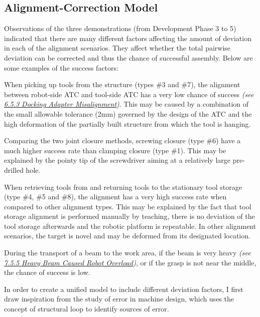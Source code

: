 \subsection{Alignment-Correction Model}

Observations of the three demonstrations (from Development Phase 3 to 5) indicated that there are many different factors affecting the amount of deviation in each of the alignment scenarios. They affect whether the total pairwise deviation can be corrected and thus the chance of successful assembly. Below are some examples of the success factors:

\begin{description}[style=unboxed] %
	\item [Tight tolerance, deviation of partially assembled structure] When picking up tools from the structure (types \#3 and \#7), the alignment between robot-side ATC and tool-side ATC has a very low chance of success\textit{ (see \ul{6.5.3 Docking Adapter Misalignment})}. This may be caused by a combination of the small allowable tolerance (2mm) governed by the design of the ATC and the high deformation of the partially built structure from which the tool is hanging. 

	\item [Correction range] Comparing the two joint closure methods, screwing closure (type \#6) have a much higher success rate than clamping closure (type \#1). This may be explained by the pointy tip of the screwdriver aiming at a relatively large pre-drilled hole.

	\item [Deviation] When retrieving tools from and returning tools to the stationary tool storage (type \#4, \#5 and \#8), the alignment has a very high success rate when compared to other alignment types. This may be explained by the fact that tool storage alignment is performed manually by teaching, there is no deviation of the tool storage afterwards and the robotic platform is repeatable. In other alignment scenarios, the target is novel and may be deformed from its designated location.

	\item [Payload] During the transport of a beam to the work area, if the beam is very heavy \textit{(see \ul{7.5.5 Heavy Beam Caused Robot Overload})}, or if the grasp is not near the middle, the chance of success is low. 

\end{description}
In order to create a unified model to include different deviation factors, I first draw inspiration from the study of error in machine design, which uses the concept of structural loop to identify sources of error.

